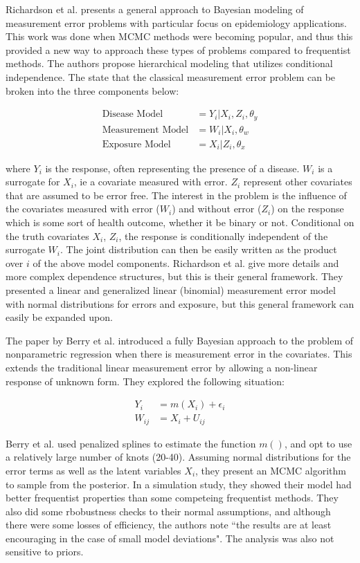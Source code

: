 \documentclass[11pt]{article}\usepackage[]{graphicx}\usepackage[]{color}
\begin{document}
Richardson et al. \cite{richardson} presents a general approach to Bayesian modeling of measurement error problems with particular focus on epidemiology applications. This work was done when MCMC methods were becoming popular, and thus this provided a new way to approach these types of problems compared to frequentist methods. The authors propose hierarchical modeling that utilizes conditional independence. The state that the classical measurement error problem can be broken into the three components below: 

\begin{align}
  \text{Disease Model} &= Y_i|X_i,Z_i,\theta_y \\
  \text{Measurement Model} &= W_i|X_i,\theta_w \\
  \text{Exposure Model} &= X_i|Z_i,\theta_x
\end{align}

where $Y_i$ is the response, often representing the presence of a disease. $W_i$ is a surrogate for $X_i$, ie a covariate measured with error. $Z_i$ represent other covariates that are assumed to be error free. The interest in the problem is the influence of the covariates measured with error ($W_i$) and without error ($Z_i$) on the response which is some sort of health outcome, whether it be binary or not. Conditional on the truth covariates $X_i$, $Z_i$, the response is conditionally independent of the surrogate $W_i$. The joint distribution can then be easily written as the product over $i$ of the above model components. Richardson et al. give more details and more complex dependence structures, but this is their general framework. They presented a linear and generalized linear (binomial) measurement error model with normal distributions for errors and exposure, but this general framework can easily be expanded upon.


The paper by Berry et al. \cite{berry02} introduced a fully Bayesian approach to the problem of nonparametric regression when there is measurement error in the covariates. This extends the traditional linear measurement error by allowing a non-linear response of unknown form. They explored the following situation:

\begin{align}
  Y_i &= m(X_i) + \epsilon_i \\
  W_{ij} &= X_i + U_{ij} 
\end{align}

Berry et al. used penalized splines to estimate the function $m()$, and opt to use a relatively large number of knots (20-40). Assuming normal distributions for the error terms as well as the latent variables $X_i$, they present an MCMC algorithm to sample from the posterior. In a simulation study, they showed their model had better frequentist properties than some competeing frequentist methods. They also did some rbobustness checks to their normal assumptions, and although there were some losses of efficiency, the authors note ``the results are at least encouraging in the case of small model deviations". The analysis was also not sensitive to priors. 
\end{document}

